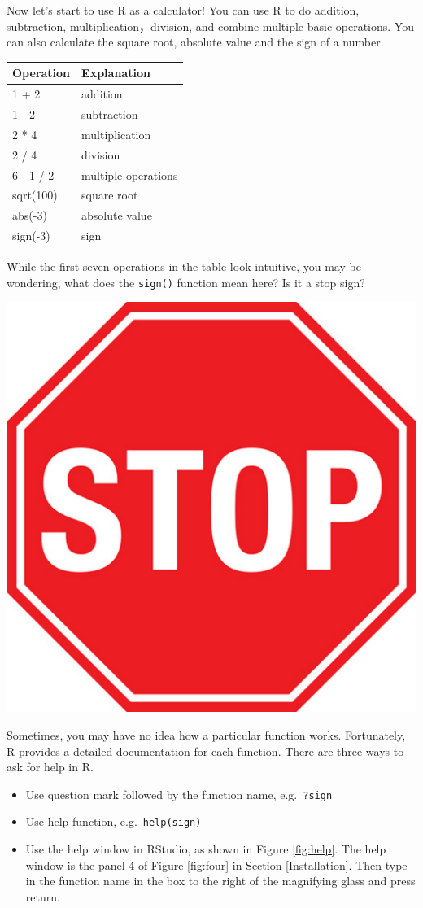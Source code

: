 \documentclass[
]{book}
\providecommand{\tightlist}{%
  \setlength{\itemsep}{0pt}\setlength{\parskip}{0pt}}
\begin{document}
Now let's start to use R as a calculator! You can use R to do addition, subtraction, multiplication，division, and combine multiple basic operations. You can also calculate the square root, absolute value and the sign of a number.

\begin{tabular}{l|l}
\hline
Operation & Explanation\\
\hline
1 + 2 & addition\\
\hline
1 - 2 & subtraction\\
\hline
2 * 4 & multiplication\\
\hline
2 / 4 & division\\
\hline
6 - 1 / 2 & multiple operations\\
\hline
sqrt(100) & square root\\
\hline
abs(-3) & absolute value\\
\hline
sign(-3) & sign\\
\hline
\end{tabular}

While the first seven operations in the table look intuitive, you may be wondering, what does the \texttt{sign()} function mean here? Is it a stop sign?

\begin{center}\includegraphics[width=0.16\linewidth]{pics/1stop} \end{center}

Sometimes, you may have no idea how a particular function works. Fortunately, R provides a detailed documentation for each function. There are three ways to ask for help in R.

\begin{itemize}
\tightlist
\item
  Use question mark followed by the function name, e.g.~\texttt{?sign}\\
\item
  Use help function, e.g.~\texttt{help(sign)}
\item
  Use the help window in RStudio, as shown in Figure \ref{fig:help}. The help window is the panel 4 of Figure \ref{fig:four} in Section \ref{Installation}. Then type in the function name in the box to the right of the magnifying glass and press return.
\end{itemize}
\end{document}
